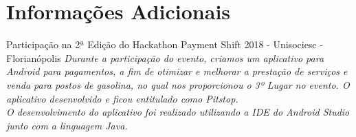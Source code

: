 \documentclass[]{friggeri-cv}
\begin{document}
\section{Informações Adicionais}
\begin{entrylist}
    {Participação na 2ª Edição do Hackathon Payment Shift 2018}
    {- Unisociesc - Florianópolis}
    {\emph{ Durante a participação do evento, criamos um aplicativo para Android para pagamentos, a fim de otimizar e melhorar a prestação de serviços e venda para postos de gasolina, no qual nos proporcionou o 3º Lugar no evento. O aplicativo desenvolvido e ficou entitulado como Pitstop. \\
    O desenvolvimento do aplicativo foi realizado utilizando a IDE do Android Studio junto com a linguagem Java.}}

\end{entrylist}
\end{document}
